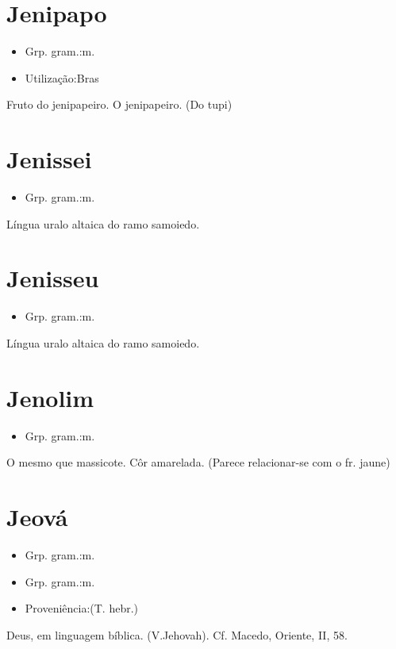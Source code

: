 \documentclass{article}
\begin{document}
\section{Jenipapo}
\begin{itemize}
\item {Grp. gram.:m.}
\end{itemize}
\begin{itemize}
\item {Utilização:Bras}
\end{itemize}
Fruto do jenipapeiro.
O jenipapeiro.
(Do tupi)
\section{Jenissei}
\begin{itemize}
\item {Grp. gram.:m.}
\end{itemize}
Língua uralo altaica do ramo samoiedo.
\section{Jenisseu}
\begin{itemize}
\item {Grp. gram.:m.}
\end{itemize}
Língua uralo altaica do ramo samoiedo.
\section{Jenolim}
\begin{itemize}
\item {Grp. gram.:m.}
\end{itemize}
O mesmo que \textunderscore massicote\textunderscore .
Côr amarelada.
(Parece relacionar-se com o fr. \textunderscore jaune\textunderscore )
\section{Jeová}
\begin{itemize}
\item {Grp. gram.:m.}
\end{itemize}
\begin{itemize}
\item {Grp. gram.:m.}
\end{itemize}
\begin{itemize}
\item {Proveniência:(T. hebr.)}
\end{itemize}
Deus, em linguagem bíblica.
(V.Jehovah). Cf. Macedo, \textunderscore Oriente\textunderscore , II, 58.
\end{document}
